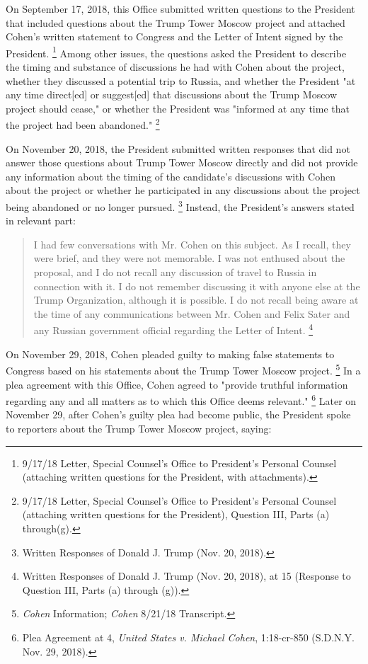 On September 17, 2018, this Office submitted written questions to the President that included questions about the Trump Tower Moscow project and attached Cohen's written statement to Congress and the Letter of Intent signed by the President.%
\footnote{9/17/18 Letter, Special Counsel’s Office to President’s Personal Counsel (attaching written questions for the President, with attachments).}
Among other issues, the questions asked the President to describe the timing and substance of discussions he had with Cohen about the project, whether they discussed a potential trip to Russia, and whether the President "at any time direct[ed] or suggest[ed] that discussions about the Trump Moscow project should cease," or whether the President was "informed at any time that the project had been abandoned."%
\footnote{9/17/18 Letter, Special Counsel’s Office to President’s Personal Counsel (attaching written questions for the President), Question III, Parts (a) through(g).}

On November 20, 2018, the President submitted written responses that did not answer those questions about Trump Tower Moscow directly and did not provide any information about the timing of the candidate's discussions with Cohen about the project or whether he participated in any discussions about the project being abandoned or no longer pursued.%
\footnote{Written Responses of Donald J. Trump (Nov. 20, 2018).}
Instead, the President's answers stated in relevant part:

\begin{quote}
I had few conversations with Mr. Cohen on this subject.
As I recall, they were brief, and they were not memorable.
I was not enthused about the proposal, and I do not recall any discussion of travel to Russia in connection with it.
I do not remember discussing it with anyone else at the Trump Organization, although it is possible.
I do not recall being aware at the time of any communications between Mr. Cohen and Felix Sater and any Russian government official regarding the Letter of Intent.%
\footnote{Written Responses of Donald J. Trump (Nov. 20, 2018), at 15 (Response to Question III, Parts (a) through (g)).}
\end{quote}

On November 29, 2018, Cohen pleaded guilty to making false statements to Congress based on his statements about the Trump Tower Moscow project.%
\footnote{\textit{Cohen} Information;
\textit{Cohen} 8/21/18 Transcript.}
In a plea agreement with this Office, Cohen agreed to "provide truthful information regarding any and all matters as to which this Office deems relevant."%
\footnote{Plea Agreement at 4, \textit{United States v. Michael Cohen}, 1:18-cr-850 (S.D.N.Y. Nov. 29, 2018).}
Later on November 29, after Cohen's guilty plea had become public, the President spoke to reporters about the Trump Tower Moscow project, saying:

